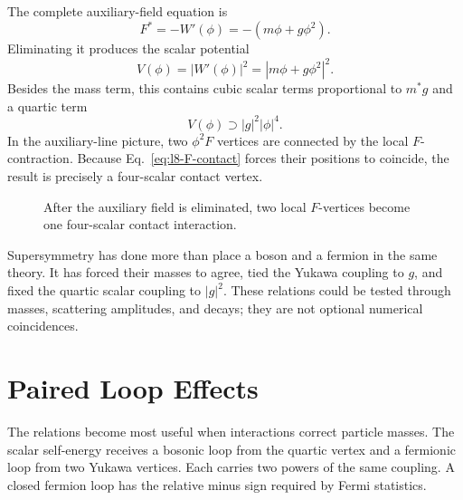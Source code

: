 The complete auxiliary-field equation is
\begin{equation}
F^\ast=-W'(\phi)=-(m\phi+g\phi^2).
\label{eq:l8-general-F-equation}
\end{equation}
Eliminating it produces the scalar potential
\begin{equation}
V(\phi)=|W'(\phi)|^2
=|m\phi+g\phi^2|^2.
\label{eq:l8-scalar-potential}
\end{equation}
Besides the mass term, this contains cubic scalar terms proportional to \(m^\ast g\) and a quartic term
\begin{equation}
V(\phi)\supset |g|^2|\phi|^4.
\label{eq:l8-quartic}
\end{equation}
In the auxiliary-line picture, two \(\phi^2F\) vertices are connected by the local \(F\)-contraction. Because Eq.~\eqref{eq:l8-F-contact} forces their positions to coincide, the result is precisely a four-scalar contact vertex.

\begin{figure}[H]
\centering
{}
\caption{After the auxiliary field is eliminated, two local \(F\)-vertices become one four-scalar contact interaction.}
\end{figure}

Supersymmetry has done more than place a boson and a fermion in the same theory. It has forced their masses to agree, tied the Yukawa coupling to \(g\), and fixed the quartic scalar coupling to \(|g|^2\). These relations could be tested through masses, scattering amplitudes, and decays; they are not optional numerical coincidences.

\section{Paired Loop Effects}

The relations become most useful when interactions correct particle masses. The scalar self-energy receives a bosonic loop from the quartic vertex and a fermionic loop from two Yukawa vertices. Each carries two powers of the same coupling. A closed fermion loop has the relative minus sign required by Fermi statistics.

